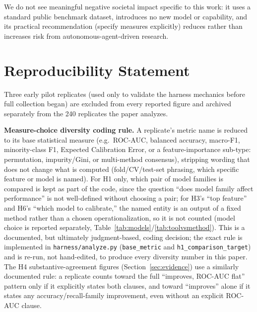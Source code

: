 \documentclass{article}
\begin{document}
We do not see meaningful negative societal impact specific to this work: it uses a
standard public benchmark dataset, introduces no new model or capability, and its
practical recommendation (specify measures explicitly) reduces rather than increases risk
from autonomous-agent-driven research.

\clearpage
\appendix

\section{Reproducibility Statement}
\label{sec:reproducibility}

Three early pilot replicates (used only to validate the harness mechanics before full
collection began) are excluded from every reported figure and archived separately from the
240 replicates the paper analyzes.

\textbf{Measure-choice diversity coding rule.} A replicate's metric name is reduced to its
base statistical measure (e.g.\ ROC-AUC, balanced accuracy, macro-F1, minority-class F1,
Expected Calibration Error, or a feature-importance sub-type: permutation, impurity/Gini,
or multi-method consensus), stripping wording that does not change what is computed
(fold/CV/test-set phrasing, which specific feature or model is named). For H1 only, which
pair of model families is compared is kept as part of the code, since the question ``does
model family affect performance'' is not well-defined without choosing a pair; for H3's
``top feature'' and H6's ``which model to calibrate,'' the named entity is an output of a
fixed method rather than a chosen operationalization, so it is not counted (model choice is
reported separately, Table~\ref{tab:models}/\ref{tab:toolvsmethod}). This is a documented, but ultimately judgment-based,
coding decision; the exact rule is implemented in \texttt{harness/analyze.py}
(\texttt{base\_metric} and \texttt{h1\_comparison\_target}) and is re-run, not hand-edited,
to produce every diversity number in this paper. The H4 substantive-agreement figures
(Section~\ref{sec:evidence}) use a similarly documented rule: a replicate counts toward the
full ``improves, ROC-AUC flat'' pattern only if it explicitly states both clauses, and
toward ``improves'' alone if it states any accuracy/recall-family improvement, even without
an explicit ROC-AUC clause.
\end{document}
